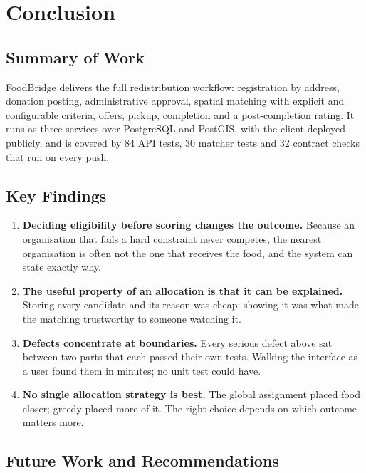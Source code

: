 \documentclass[11pt,a4paper]{report}
\begin{document}
\chapter{Conclusion}

\section{Summary of Work}

FoodBridge delivers the full redistribution workflow: registration by address,
donation posting, administrative approval, spatial matching with explicit and
configurable criteria, offers, pickup, completion and a post-completion rating.
It runs as three services over PostgreSQL and PostGIS, with the client deployed
publicly, and is covered by 84 API tests, 30 matcher tests and 32 contract
checks that run on every push.

\section{Key Findings}

\begin{enumerate}
  \item \textbf{Deciding eligibility before scoring changes the outcome.} Because
    an organisation that fails a hard constraint never competes, the nearest
    organisation is often not the one that receives the food, and the system can
    state exactly why.
  \item \textbf{The useful property of an allocation is that it can be
    explained.} Storing every candidate and its reason was cheap; showing it was
    what made the matching trustworthy to someone watching it.
  \item \textbf{Defects concentrate at boundaries.} Every serious defect above
    sat between two parts that each passed their own tests. Walking the interface
    as a user found them in minutes; no unit test could have.
  \item \textbf{No single allocation strategy is best.} The global assignment
    placed food closer; greedy placed more of it. The right choice depends on
    which outcome matters more.
\end{enumerate}

\section{Future Work and Recommendations}
\end{document}
